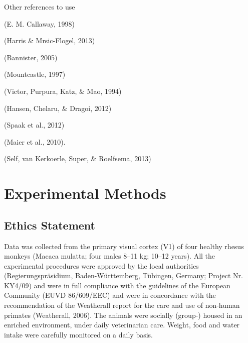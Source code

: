 \documentclass{article}
\begin{document}
Other references to use

(E. M. Callaway, 1998)

(Harris \& Mrsic-Flogel, 2013)

(Bannister, 2005)

(Mountcastle, 1997) 

(Victor, Purpura, Katz, \& Mao, 1994)

(Hansen, Chelaru, \& Dragoi, 2012)

(Spaak et al., 2012)

(Maier et al., 2010).

(Self, van Kerkoerle, Super, \& Roelfsema, 2013)

\section[Experimental Methods]{Experimental Methods}
\subsection{Ethics Statement}
Data was collected from the primary visual cortex (V1) of four healthy rhesus monkeys (Macaca mulatta; four males 8--11 kg; 10--12 years). All the experimental procedures were approved by the local authorities (Regierungspr\"asidium, Baden-W\"urttemberg, T\"ubingen, Germany; Project Nr. KY4/09) and were in full compliance with the guidelines of the European Community (EUVD 86/609/EEC) and were in concordance with the recommendation of the Weatherall report for the care and use of non-human primates (Weatherall, 2006). The animals were socially (group-) housed in an enriched environment, under daily veterinarian care. Weight, food and water intake were carefully monitored on a daily basis.
\end{document}
